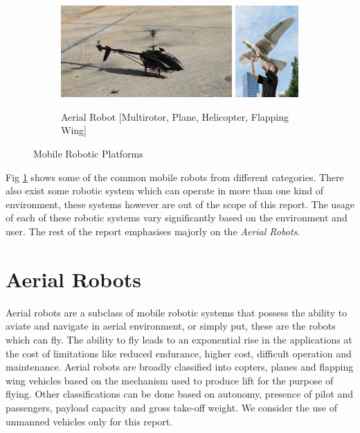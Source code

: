 \begin{spacing}{2}
\begin{figure}[h]
\begin{subfigure}{\textwidth}
\includegraphics[width=0.23\linewidth, height=3.5cm, trim= 5 30 5 40,clip]{image/helicopter.jpg} \includegraphics[width=0.23\linewidth, height=3.5cm, trim= 0 70 0 50,clip]{image/smartbird.jpg}
\caption{Aerial Robot [Multirotor, Plane, Helicopter, Flapping Wing]}
\end{subfigure}

\caption{Mobile Robotic Platforms}
\label{fig:mobile robot}
\end{figure}

Fig \ref{fig:mobile robot} shows some of the common mobile robots from different categories. There also exist some robotic system which can operate in more than one kind of environment, these systems however are out of the scope of this report. The usage of each of these robotic systems vary significantly based on the environment and user. The rest of the report emphasises majorly on the \textit{Aerial Robots}.

\section{Aerial Robots}

Aerial robots are a subclass of mobile robotic systems that possess the ability to aviate and navigate in aerial environment, or simply put, these are the robots which can fly. The ability to fly leads to an exponential rise in the applications at the cost of limitations like reduced endurance, higher cost, difficult operation and maintenance. Aerial robots are broadly classified into copters, planes and flapping wing vehicles based on the mechanism used to produce lift for the purpose of flying. Other classifications can be done based on autonomy, presence of pilot and passengers, payload capacity and gross take-off weight. We consider the use of unmanned vehicles only for this report.


\end{spacing}
